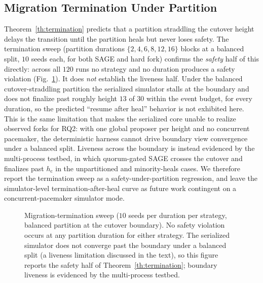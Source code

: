 \documentclass[journal]{IEEEtran}
\theoremstyle{remark}
\begin{document}
\subsection{Migration Termination Under Partition}
Theorem~\ref{th:termination} predicts that a partition straddling the cutover height delays
the transition until the partition heals but never loses safety. The termination
sweep (partition durations $\{2,4,6,8,12,16\}$ blocks at a
balanced split, $10$ seeds each, for both SAGE and hard fork) confirms the \emph{safety} half of
this directly: across all $120$ runs no strategy and no duration produces a safety violation
(Fig.~\ref{fig:termination}). It does \emph{not} establish the liveness half. Under the balanced
cutover-straddling partition the serialized simulator stalls at the boundary and does not finalize
past roughly height $13$ of $30$ within the event budget, for every duration, so the predicted
``resume after heal'' behavior is not exhibited here. This is the same limitation that makes the
serialized core unable to realize observed forks for RQ2: with one global proposer per height and
no concurrent pacemaker, the deterministic harness cannot drive boundary view convergence under a
balanced split. Liveness across the boundary is instead evidenced by the multi-process testbed,
in which quorum-gated SAGE crosses the cutover and finalizes past $h_{\mathrm{c}}$ in the
unpartitioned and minority-heals cases. We therefore report the termination sweep as a
safety-under-partition regression, and leave the simulator-level termination-after-heal curve as
future work contingent on a concurrent-pacemaker simulator mode.

\begin{figure}[t]
\centering
{}
\caption{Migration-termination sweep ($10$ seeds per duration per strategy, balanced
partition at the cutover boundary). No safety violation occurs at any partition duration for
either strategy. The serialized simulator does not converge past the boundary under a balanced
split (a liveness limitation discussed in the text), so this figure reports the safety half of
Theorem~\ref{th:termination}; boundary liveness is evidenced by the multi-process testbed.}
\label{fig:termination}
\end{figure}
\end{document}
